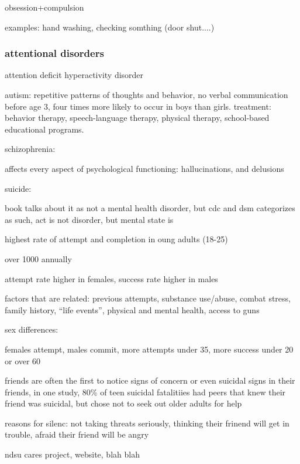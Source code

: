 \documentclass[letterpaper]{article}
\begin{document}
obsession+compulsion

examples: hand washing, checking somthing (door shut....)

\subsubsection*{attentional disorders}
attention deficit hyperactivity disorder

autism: repetitive patterns of thoughts and behavior, no verbal communication before age 3, four times more likely to occur in boys than girls.  treatment: behavior therapy, speech-language therapy, physical therapy, school-based educational programs.

schizophrenia:

affects every aspect of psychological functioning: hallucinations, and delusions

suicide:

book talks about it as not a mental health disorder, but cdc and dsm categorizes as such, act is not disorder, but mental state is

highest rate of attempt and completion in oung adults (18-25)

over 1000 annually

attempt rate higher in females, success rate higher in males

factors that are related: previous attempts, substance use/abuse, combat stress, family history, ``life events'', physical and mental health, access to guns

sex differences:

females attempt, males commit, more attempts under 35, more success under 20 or over 60

friends are often the first to notice signs of concern or even suicidal signs in their friends, in one study, 80\% of teen suicidal fatalitiies had peers that knew their friend was suicidal, but chose not to seek out older adults for help

reasons for silenc: not taking threats seriously, thinking their  frinend will get in trouble, afraid their friend will be angry


ndsu cares project, website, blah blah
\end{document}
